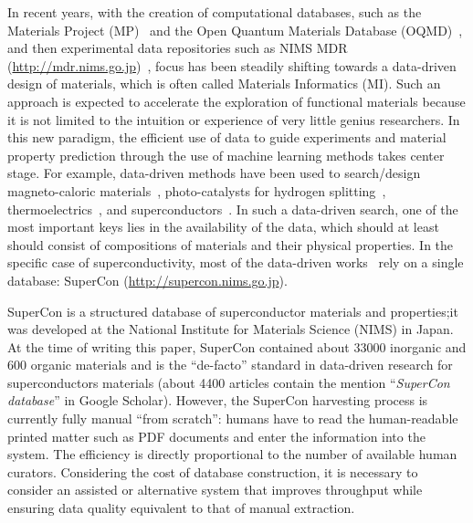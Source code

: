 \documentclass[12pt, a4paper]{report}
\begin{document}

In recent years, with the creation of computational databases, such as the Materials Project (MP)~\cite{materialsprojectJain2013} and the Open Quantum Materials Database (OQMD)~\cite{oqmdkirklin2015open}, and then experimental data repositories such as NIMS MDR (\url{http://mdr.nims.go.jp})~\cite{ranganathan_anusha_2019_3553963}, focus has been steadily shifting towards a data-driven design of materials, which is often called Materials Informatics (MI).
Such an approach is expected to accelerate the exploration of functional materials because it is not limited to the intuition or experience of very little genius researchers.
In this new paradigm, the efficient use of data to guide experiments and material property prediction through the use of machine learning methods takes center stage.
For example, data-driven methods have been used to search/design magneto-caloric materials~\cite{Bocarsly2017,Castro2020-12,court2021inverse}, photo-catalysts for hydrogen splitting~\cite{xiong2021optimizing}, thermoelectrics~\cite{iwasaki2019machine}, and superconductors~\cite{stanev_machine_2017}.
In such a data-driven search, one of the most important keys lies in the availability of the data, which should at least should consist of compositions of materials and their physical properties.
In the specific case of superconductivity, most of the data-driven works~\cite{stanev_machine_2017, le2020critical,Hamlin2019SuperconductivityNR} rely on a single database: SuperCon (\url{http://supercon.nims.go.jp}).

SuperCon is a structured database of superconductor materials and properties;it was developed at the National Institute for Materials Science (NIMS) in Japan.
At the time of writing this paper, SuperCon contained about 33000 inorganic and 600 organic materials and is the ``de-facto'' standard in data-driven research for superconductors materials (about 4400 articles contain the mention ``\textit{SuperCon database}'' in Google Scholar).
However, the SuperCon harvesting process is currently fully manual ``from scratch'': humans have to read the human-readable printed matter such as PDF documents and enter the information into the system.
The efficiency is directly proportional to the number of available human curators.
Considering the cost of database construction, it is necessary to consider an assisted or alternative system that improves throughput while ensuring data quality equivalent to that of manual extraction.
\end{document}

